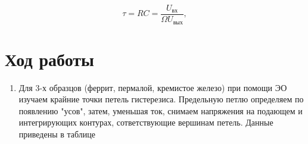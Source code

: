 \documentclass[12pt,a4paper]{article}
\begin{document}
\begin{equation}
    \tau = RC = \frac{U_{вх}}{\varOmega U_{вых}}, \label{eq:ref}
\end{equation}

\section{Ход работы}

\begin{enumerate}
    \item Для 3-х образцов (феррит, пермалой, кремистое железо) при помощи ЭО изучаем крайние точки петель гистерезиса. Предельную петлю определяем по появлению "усов", затем, уменьшая ток, снимаем напряжения на подающем и интегрирующих контурах, сответствующие вершинам петель.
    Данные приведены в таблице 


\end{enumerate}
\end{document}
